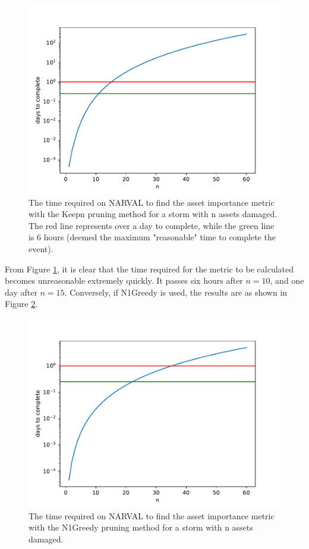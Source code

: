 \documentclass[12pt]{article}
\begin{document}
\begin{figure}[ht]
    \centering %
    \includegraphics[width=\textwidth]{Keepnnumsims.pdf}
    \caption[Time required to find importance metric with Keepn]{The time required on NARVAL to find the asset importance metric with the Keepn pruning method for a storm with n assets damaged. The red line represents over a day to complete, while the green line is 6 hours (deemed the maximum "reasonable" time to complete the event).}
    \label{fig:Keepnnumsims}
\end{figure}

From Figure \ref{fig:Keepnnumsims}, it is clear that the time required for the metric to be calculated becomes unreasonable extremely quickly. It passes six hours after $n = 10$, and one day after $n = 15$. Conversely, if N1Greedy is used, the results are as shown in Figure \ref{fig:Keep1numsims}. \par


\begin{figure}[ht]
    \centering %
    \includegraphics[width=\textwidth]{Keep1numsims.pdf}
    \caption[Time required to find importance metric with N1Greedy]{The time required on NARVAL to find the asset importance metric with the N1Greedy pruning method for a storm with n assets damaged.}
    \label{fig:Keep1numsims}
\end{figure}
\end{document}
